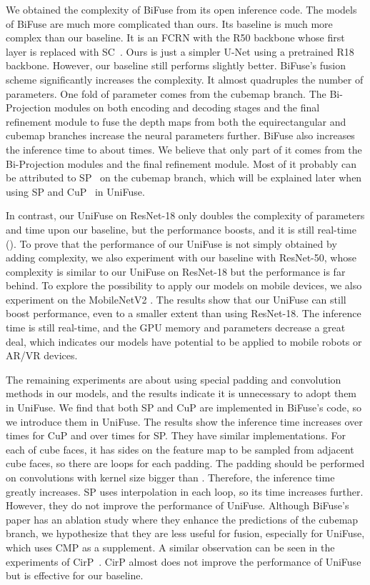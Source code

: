 \documentclass[letterpaper, 10 pt, conference]{ieeeconf}
\begin{document}
We obtained the complexity of BiFuse from its open inference code. The models of BiFuse are much more complicated than ours. 
{Its baseline is much more complex than our baseline. 
It is an FCRN \cite{laina2016deeper} with the R50 backbone whose first layer is replaced with SC~\cite{su2017learning}. Ours is just a simpler U-Net using a pretrained R18 backbone. However, our baseline still performs slightly better. }
BiFuse's fusion scheme significantly increases the complexity. It almost quadruples the number of parameters. One fold of parameter comes from the cubemap branch. The Bi-Projection modules on both encoding and decoding stages and the final refinement module to fuse the depth maps from both the equirectangular and cubemap branches increase the neural parameters further.
BiFuse also increases the inference time {to about } times. We believe that only part of it comes from the Bi-Projection modules and the final refinement module. Most of it probably can be attributed to SP~\cite{wang2020bifuse} on the cubemap branch{, which will be explained later when using SP and CuP~\cite{cheng2018cube} in UniFuse}.

In contrast, our UniFuse on ResNet-18 only doubles the complexity of parameters and time upon our baseline, but the performance boosts, and it is still real-time (). To prove that the performance of our UniFuse is not simply obtained by adding complexity, we also experiment with our baseline with ResNet-50, whose complexity is similar to our UniFuse on ResNet-18 but the performance is far behind. To explore the possibility to apply our models on mobile devices, we also experiment on the MobileNetV2 \cite{sandler2018mobilenetv2}. The results show that our UniFuse can still boost performance, even to a smaller extent than using ResNet-18. The inference time is still real-time, and the GPU memory and parameters decrease a great deal, which indicates our models have potential to be applied to mobile robots or AR/VR devices.   

{The remaining experiments are about using special padding and convolution methods in our models, and the results indicate it is unnecessary to adopt them in UniFuse. We find that both SP and CuP are implemented in BiFuse's code, so we introduce them in UniFuse. The results show the inference time increases over  times for CuP and over  times for SP. They have similar implementations. For each of  cube faces, it has  sides on the feature map to be sampled from adjacent cube faces, so there are  loops for each padding. The padding should be performed on convolutions with kernel size bigger than . Therefore, the inference time greatly increases. SP uses interpolation in each loop, so its time increases further. However, they do not improve the performance of UniFuse. Although BiFuse's paper has an ablation study where they enhance the predictions of the cubemap branch, we hypothesize that they are less useful for fusion, especially for UniFuse, which uses CMP as a supplement. 
A similar observation can be seen in the experiments of CirP~\cite{wang2018omnidirectional}. CirP almost does not improve the performance of UniFuse but is effective for our baseline. } 
\end{document}
